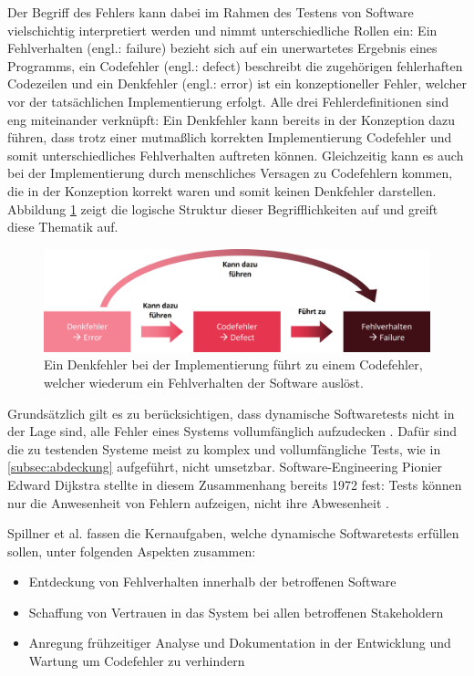 Der Begriff des Fehlers kann dabei im Rahmen des Testens von Software vielschichtig interpretiert werden und nimmt unterschiedliche Rollen ein: Ein Fehlverhalten (engl.: failure) bezieht sich auf ein unerwartetes Ergebnis eines Programms, ein Codefehler (engl.: defect) beschreibt die zugehörigen fehlerhaften Codezeilen und ein Denkfehler (engl.: error) ist ein konzeptioneller Fehler, welcher vor der tatsächlichen Implementierung erfolgt. Alle drei Fehlerdefinitionen sind eng miteinander verknüpft: Ein Denkfehler kann bereits in der Konzeption dazu führen, dass trotz einer mutmaßlich korrekten Implementierung Codefehler und somit unterschiedliches Fehlverhalten auftreten können. Gleichzeitig kann es auch bei der Implementierung durch menschliches Versagen zu Codefehlern kommen, die in der Konzeption korrekt waren und somit keinen Denkfehler darstellen. Abbildung \ref{fig:fehler} zeigt die logische Struktur dieser Begrifflichkeiten auf und greift diese Thematik auf.

\begin{figure}[!h]
\centering
\includegraphics[width=0.8\columnwidth]{images/Fehler_Definition.jpg}
\caption{Ein Denkfehler bei der Implementierung führt zu einem Codefehler, welcher wiederum ein Fehlverhalten der Software auslöst.}
\label{fig:fehler}
\end{figure}

Grundsätzlich gilt es zu berücksichtigen, dass dynamische Softwaretests nicht in der Lage sind, alle Fehler eines Systems vollumfänglich aufzudecken \cite[S. 247]{sommerville2012software-engineering}. Dafür sind die zu testenden Systeme meist zu komplex und vollumfängliche Tests, wie in \autoref{subsec:abdeckung} aufgeführt, nicht umsetzbar. Software-Engineering Pionier Edward Dijkstra stellte in diesem Zusammenhang bereits 1972 fest: \glqq Tests können nur die Anwesenheit von Fehlern aufzeigen, nicht ihre Abwesenheit\grqq{} \cite{dahl1972structured}.

Spillner et al. \cite[S. 8]{spillner2011software} fassen die Kernaufgaben, welche dynamische Softwaretests erfüllen sollen, unter folgenden Aspekten zusammen:
\begin{itemize}
\item Entdeckung von Fehlverhalten innerhalb der betroffenen Software
\item Schaffung von Vertrauen in das System bei allen betroffenen Stakeholdern
\item Anregung frühzeitiger Analyse und Dokumentation in der Entwicklung und Wartung um Codefehler zu verhindern
\end{itemize}

